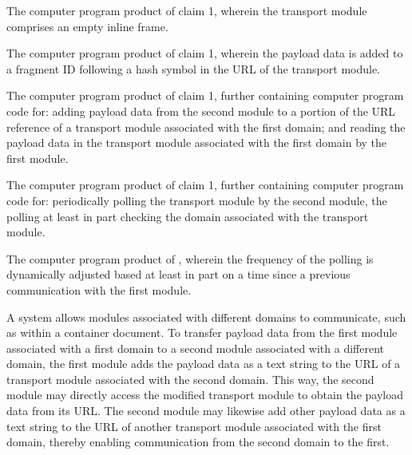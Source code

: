 The computer program product of claim 1, wherein the transport module comprises an empty inline frame.


The computer program product of claim 1, wherein the payload data is added to a fragment ID following a hash symbol in the URL of the transport module.


The computer program product of claim 1, further containing computer program code for:
\el adding payload data from the second module to a portion of the URL reference of a transport module associated with the first domain; and
\el reading the payload data in the transport module associated with the first domain by the first module.


\label{checkingclaim} The computer program product of claim 1, further containing computer program code for:
\el periodically polling the transport module by the second module, the polling at least in part checking the domain associated with the transport module.


The computer program product of \checkingclaim{}, wherein the frequency of the polling is dynamically adjusted based at least in part on a time since a previous communication with the first module.

\abstract

 A system allows modules associated with different domains to communicate, such as within a container document. To transfer payload data from the first module associated with a first domain to a second module associated with a different domain, the first module adds the payload data as a text string to the URL of a transport module associated with the second domain. This way, the second module may directly access the modified transport module to obtain the payload data from its URL. The second module may likewise add other payload data as a text string to the URL of another transport module associated with the first domain, thereby enabling communication from the second domain to the first.


\bye
